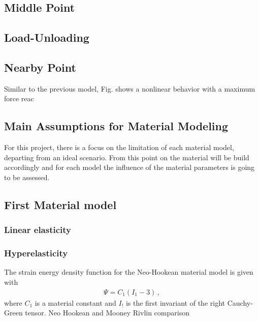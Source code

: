 \subsection*{Middle Point}
\label{subsection:midpointresult}

\subsection*{Load-Unloading}
\label{subsection:loadunloadresult}

\subsection*{Nearby Point}
\label{subsection:nearbypointresult}
Similar to the previous model, Fig. %
shows a nonlinear behavior with a maximum force reac

\subsection{Main Assumptions for Material Modeling}

For this project, there is a focus on the limitation of each material model, 
departing from an ideal scenario. From this point on the material will be build 
accordingly and for each model the influence of the material parameters is going
to be assessed.

\subsection{First Material model}

\subsubsection{Linear elasticity}


\subsubsection{Hyperelasticity}
The strain energy density function for the Neo-Hookean material model is given with
\begin{align*}
            \Psi = C_1 (I_1 - 3) \, ,
\end{align*}
where $C_1$ is a material constant and $I_!$ is the first invariant of the right Cauchy-Green tensor. 
Neo Hookean and Mooney Rivlin comparison




